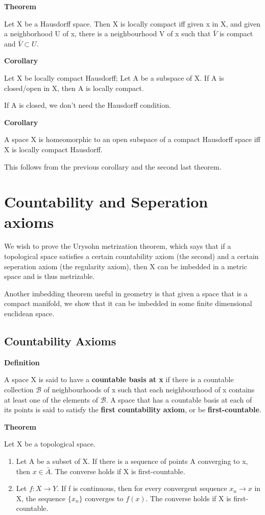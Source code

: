 \documentclass[11pt]{article}
\begin{document}
\textbf{Theorem}

Let X be a Hausdorff space. Then X is locally compact iff given x in X, and given a neighborhood U of x, there is a neighbourhood V of x such that \(\bar{V}\) is compact and \(\bar{V}\subset U\).

\textbf{Corollary}

Let X be locally compact Hausdorff; Let A be a subspace of X. If A is closed/open in X, then A is locally compact.

If A is closed, we don't need the Hausdorff condition.

\textbf{Corollary}

A space X is homeomorphic to an open subspace of a compact Hausdorff space iff X is locally compact Hausdorff.

This follows from the previous corollary and the second last theorem.

\section{Countability and Seperation axioms}
\label{sec:org793c388}

We wish to prove the Urysohn metrization theorem, which says that if a topological space satisfies a certain countability axiom (the second) and a certain seperation axiom (the regularity axiom), then X can be imbedded in a metric space and is thus metrizable.

Another imbedding theorem useful in geometry is that given a space that is a compact manifold, we show that it can be imbedded in some finite dimensional euclidean space.

\subsection{Countability Axioms}
\label{sec:org78b3aa7}

\textbf{Definition}

A space X is said to have a \textbf{countable basis at x} if there is a countable collection \(\mathcal{B}\) of neighbourhoods of x such that each neighbourhood of x contains at least one of the elements of \(\mathcal{B}\). A space that has a countable basis at each of its points is said to satisfy the \textbf{first countability axiom}, or be \textbf{first-countable}.

\textbf{Theorem}

Let X be a topological space.

\begin{enumerate}
\item Let A be a subset of X. If there is a sequence of points A converging to x, then \(x\in \bar{A}\). The converse holds if X is first-countable.
\item Let \(f: X \to Y\). If f is continuous, then for every convergent sequence \(x_n \to x\) in X, the sequence \(\{x_n\}\) converges to \(f(x)\). The converse holds if X is first-countable.
\end{enumerate}
\end{document}
